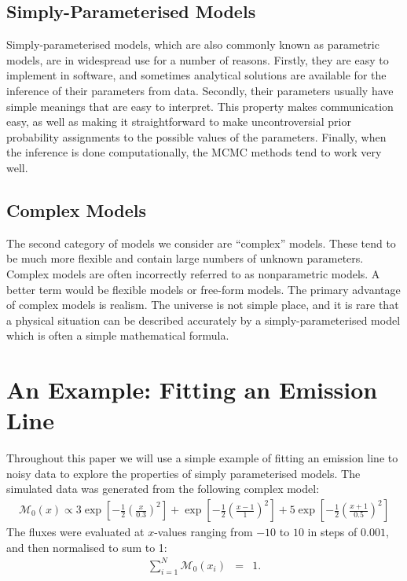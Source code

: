 \documentclass[letterpaper, 11pt]{article}
\begin{document}
\subsection{Simply-Parameterised Models}
Simply-parameterised models, which are also
commonly known as parametric models, are in widespread use for a number of reasons.
Firstly, they are easy to implement in software, and sometimes analytical
solutions are available for the inference of their parameters from data.
Secondly, their parameters usually have simple meanings that are easy to interpret.
This property makes communication easy, as well as making it straightforward to
make uncontroversial prior probability
assignments to the possible values of the parameters. Finally, when the inference
is done computationally, the MCMC methods tend to work very well.

\subsection{Complex Models}
The second category of models we consider are ``complex'' models. These tend to
be much more flexible and contain large numbers of unknown parameters. Complex
models are often incorrectly referred to as nonparametric models. A better term
would be flexible models or free-form models. The primary advantage of complex models is realism. The universe is not
simple place, and it is rare that a physical situation can be described accurately
by a simply-parameterised model which is often a simple mathematical formula.

\section{An Example: Fitting an Emission Line}
Throughout this paper we will use a simple example of fitting an emission line
to noisy data to explore the properties of simply parameterised models. The
simulated data was generated from the following complex model:
\begin{eqnarray}
\mathcal{M}_0(x) \propto 3\exp\left[-\frac{1}{2}\left(\frac{x}{0.3}\right)^2\right]
+ \exp\left[-\frac{1}{2}\left(\frac{x - 1}{1}\right)^2\right]
+ 5\exp\left[-\frac{1}{2}\left(\frac{x + 1}{0.5}\right)^2\right]
\end{eqnarray}
The fluxes were evaluated at $x$-values ranging from $-10$ to $10$ in steps
of $0.001$, and then normalised to sum to 1:
\begin{eqnarray}
\sum_{i=1}^N \mathcal{M}_0(x_i) &=& 1.
\end{eqnarray}
\end{document}
